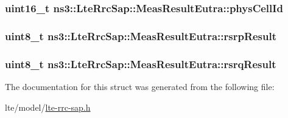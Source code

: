 \subsubsection[{\texorpdfstring{phys\+Cell\+Id}{physCellId}}]{\setlength{\rightskip}{0pt plus 5cm}uint16\+\_\+t ns3\+::\+Lte\+Rrc\+Sap\+::\+Meas\+Result\+Eutra\+::phys\+Cell\+Id}\hypertarget{structns3_1_1LteRrcSap_1_1MeasResultEutra_a8b78981481aaf789be9cbf77caf87c7c}{}\label{structns3_1_1LteRrcSap_1_1MeasResultEutra_a8b78981481aaf789be9cbf77caf87c7c}
\subsubsection[{\texorpdfstring{rsrp\+Result}{rsrpResult}}]{\setlength{\rightskip}{0pt plus 5cm}uint8\+\_\+t ns3\+::\+Lte\+Rrc\+Sap\+::\+Meas\+Result\+Eutra\+::rsrp\+Result}\hypertarget{structns3_1_1LteRrcSap_1_1MeasResultEutra_a26bb10f458fef3bc865039286c20b358}{}\label{structns3_1_1LteRrcSap_1_1MeasResultEutra_a26bb10f458fef3bc865039286c20b358}
\subsubsection[{\texorpdfstring{rsrq\+Result}{rsrqResult}}]{\setlength{\rightskip}{0pt plus 5cm}uint8\+\_\+t ns3\+::\+Lte\+Rrc\+Sap\+::\+Meas\+Result\+Eutra\+::rsrq\+Result}\hypertarget{structns3_1_1LteRrcSap_1_1MeasResultEutra_a18e766d203146f783accd739eab2544f}{}\label{structns3_1_1LteRrcSap_1_1MeasResultEutra_a18e766d203146f783accd739eab2544f}


The documentation for this struct was generated from the following file\+:\begin{DoxyCompactItemize}
\item 
lte/model/\hyperlink{lte-rrc-sap_8h}{lte-\/rrc-\/sap.\+h}\end{DoxyCompactItemize}

